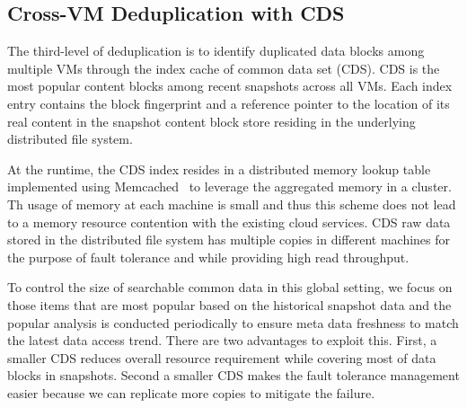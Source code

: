 \subsection{Cross-VM Deduplication with CDS}

The third-level of deduplication is to identify duplicated data blocks among multiple VMs through the index cache
of common data set (CDS).  CDS is the most popular content blocks 
among  recent snapshots across all VMs. 
Each index entry contains  the block fingerprint and a reference pointer to the location of its real content
in the snapshot content block store residing in the underlying distributed file system.

At the runtime, the CDS index resides in a distributed  memory lookup table  
implemented using Memcached~\cite{memcached} to leverage the aggregated memory in a cluster.
Th usage of memory at each machine is small and thus  this scheme  does not
lead to  a memory resource contention with the existing cloud services.
CDS raw data stored  in the distributed file system
has multiple copies in different machines for the purpose of fault tolerance and 
while providing high read  throughput.  



To control the size of searchable common data in this global setting, we focus on those items that 
are most popular based on the historical snapshot data and the popular analysis is conducted periodically to ensure 
meta data freshness to match the latest data access trend.
There are two advantages to exploit this.
First, a smaller CDS reduces overall resource requirement while covering  most of data blocks in snapshots.
Second a smaller CDS makes the fault tolerance management  easier because we can replicate  more copies
to mitigate the failure.


